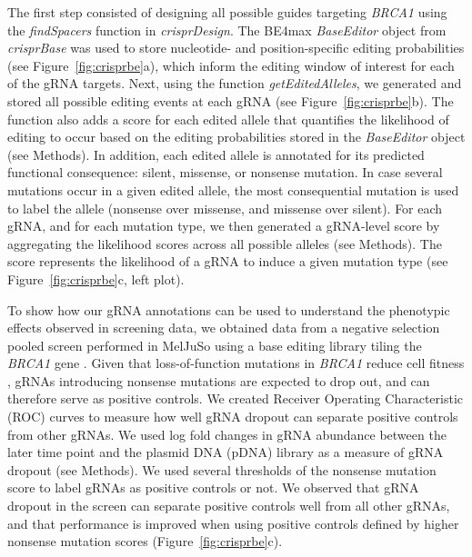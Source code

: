 \documentclass[pdftex,english,10pt]{article}
\begin{document}
The first step consisted of designing all possible guides targeting \textit{BRCA1} using the \textit{findSpacers} function in \textit{crisprDesign}. The BE4max \textit{BaseEditor} object from \textit{crisprBase} was used to store nucleotide- and position-specific editing probabilities (see Figure~\ref{fig:crisprbe}a), which inform the editing window of interest for each of the gRNA targets. Next, using the function \textit{getEditedAlleles}, we generated and stored all possible editing events at each gRNA (see Figure~\ref{fig:crisprbe}b). The function also adds a score for each edited allele that quantifies the likelihood of editing to occur based on the editing probabilities stored in the \textit{BaseEditor} object (see Methods). In addition, each edited allele is annotated for its predicted functional consequence: silent, missense, or nonsense mutation. In case several mutations occur in a given edited allele, the most consequential mutation is used to label the allele (nonsense over missense, and missense over silent).  For each gRNA, and for each mutation type, we then generated a gRNA-level score by aggregating the likelihood scores across all possible alleles (see Methods). The score represents the likelihood of a gRNA to induce a given mutation type (see Figure~\ref{fig:crisprbe}c, left plot). 

To show how our gRNA annotations can be used to understand the phenotypic effects observed in screening data, we obtained data from a negative selection pooled screen performed in MelJuSo using a base editing library tiling the \textit{BRCA1} gene \citep{hanna2021massively}. Given that loss-of-function mutations in \textit{BRCA1} reduce cell fitness \citep{findlay2018accurate}, gRNAs introducing nonsense mutations are expected to drop out, and can therefore serve as positive controls. We created Receiver Operating Characteristic (ROC) curves to measure how well gRNA dropout can separate positive controls from other gRNAs. We used log fold changes in gRNA abundance between the later time point and the plasmid DNA (pDNA) library as a measure of gRNA dropout (see Methods). We used several thresholds of the nonsense mutation score to label gRNAs as positive controls or not. We observed that gRNA dropout in the screen can separate positive controls well from all other gRNAs, and that performance is improved when using positive controls defined by higher nonsense mutation scores (Figure~\ref{fig:crisprbe}c). 
\end{document}
